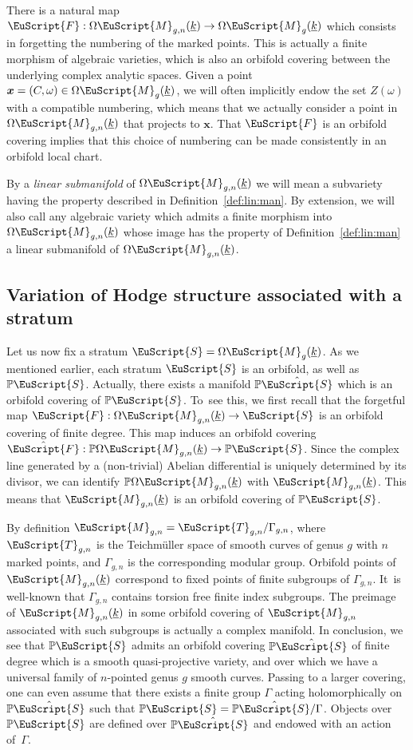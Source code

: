\documentclass[JEP,XML,SOM,Unicode]{cedram}
\let\mathcal\EuScript
\theoremstyle{plain}
\theoremstyle{definition}
\newcommand{\Pb}{\mathbb{P}}
\newcommand{\xx}{\boldsymbol{x}}
\newcommand{\Fcal}{\mathcal{F}}
\newcommand{\Mcal}{\mathcal{M}}
\newcommand{\Tcal}{\mathcal{T}}
\newcommand{\cM}{\mathcal{M}}
\newcommand{\cS}{\mathcal{S}}
\let\G\Gamma
\let\omg\omega
\let\ul\underline
\let\ra\to
\newcommand{\trate}{\Omega\Mcal_{g}(\ul{k})}
\begin{document}
There is a natural map $\Fcal: \Omega\cM_{g,n}(\ul{k}) \to \trate$ which consists in forgetting the numbering of the marked points.
This is actually a finite morphism of algebraic varieties, which is also an orbifold covering between the underlying complex analytic spaces.
Given a point $\xx=(C,\omg) \in \trate$, we will often implicitly endow the set $Z(\omg)$ with a compatible numbering, which means that we actually consider a point in $\Omega\cM_{g,n}(\ul{k})$ that projects to $\xx$.
That $\Fcal$ is an orbifold covering implies that this choice of numbering can be made consistently in an orbifold local chart.

By a \emph{linear submanifold} of $\Omega\cM_{g,n}(\ul{k})$ we will mean a subvariety having the property described in Definition~\ref{def:lin:man}.
By extension, we will also call any algebraic variety which admits a finite morphism into $\Omega\cM_{g,n}(\ul{k})$ whose image has the property of Definition~\ref{def:lin:man} a linear submanifold of $\Omega\cM_{g,n}(\ul{k})$.\enlargethispage{.5\baselineskip}%

\subsection{Variation of Hodge structure associated with a stratum}\label{subsec:VMHS}
Let us now fix a stratum $\cS=\trate$. As we mentioned earlier, each stratum $\cS$ is an orbifold, as well as $\Pb\cS$. Actually, there exists a manifold $\Pb\hat\cS$ which is an orbifold covering of $\Pb\cS$.
To~see this, we first recall that the forgetful map $\Fcal: \Omega\cM_{g,n}(\ul{k}) \ra\nobreak \cS$ is an orbifold covering of finite degree. This map induces an orbifold covering $\hat{\Fcal}: \Pb\Omega\cM_{g,n}(\ul{k}) \to \Pb\cS$. Since the complex line generated by a (non-trivial) Abelian differential is uniquely determined by its divisor, we can identify $\Pb\Omega\cM_{g,n}(\ul{k})$ with $\cM_{g,n}(\ul{k})$. This means that $\cM_{g,n}(\ul{k})$ is an orbifold covering of $\Pb\cS$.

By definition $\cM_{g,n}=\Tcal_{g,n}/\G_{g,n}$, where $\Tcal_{g,n}$ is the Teichmüller space of smooth curves of genus $g$ with $n$ marked points, and $\G_{g,n}$ is the corresponding modular group. Orbifold points of $\cM_{g,n}(\ul{k})$ correspond to fixed points of finite subgroups of $\G_{g,n}$. It~is well-known that $\G_{g,n}$ contains torsion free finite index subgroups. The preimage of $\cM_{g,n}(\ul{k})$ in some orbifold covering of $\cM_{g,n}$ associated with such subgroups is actually a complex manifold. In conclusion, we see that $\Pb\cS$ admits an orbifold covering $\Pb\hat{\cS}$ of finite degree which is a smooth quasi-projective variety, and over which we have a universal family of $n$-pointed genus $g$ smooth curves.
Passing to a larger covering, one can even assume that there exists a finite group $\Gamma$ acting holomorphically on $\Pb\hat\cS$ such that $\Pb\cS=\Pb\hat\cS/\Gamma$.
Objects over $\Pb\cS$ are defined over $\Pb\hat\cS$ and endowed with an action of~$\Gamma$.
\end{document}
